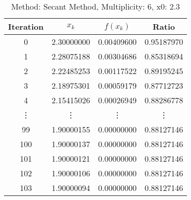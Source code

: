 \begin{table}
\centering
\caption{Method: Secant Method, Multiplicity: 6, x0: 2.3}
\label{tab:table_Secant_Method_6_2_3}
\begin{tabular}{c c c c}
\toprule
Iteration &      $x_k$ &   $f(x_k)$ &      Ratio \\
\midrule
        0 & 2.30000000 & 0.00409600 & 0.95187970 \\
        1 & 2.28075188 & 0.00304686 & 0.85318694 \\
        2 & 2.22485253 & 0.00117522 & 0.89195245 \\
        3 & 2.18975301 & 0.00059179 & 0.87712723 \\
        4 & 2.15415026 & 0.00026949 & 0.88286778 \\
   \vdots &     \vdots &     \vdots &     \vdots \\
       99 & 1.90000155 & 0.00000000 & 0.88127146 \\
      100 & 1.90000137 & 0.00000000 & 0.88127146 \\
      101 & 1.90000121 & 0.00000000 & 0.88127146 \\
      102 & 1.90000106 & 0.00000000 & 0.88127146 \\
      103 & 1.90000094 & 0.00000000 & 0.88127146 \\
\bottomrule
\end{tabular}
\end{table}

